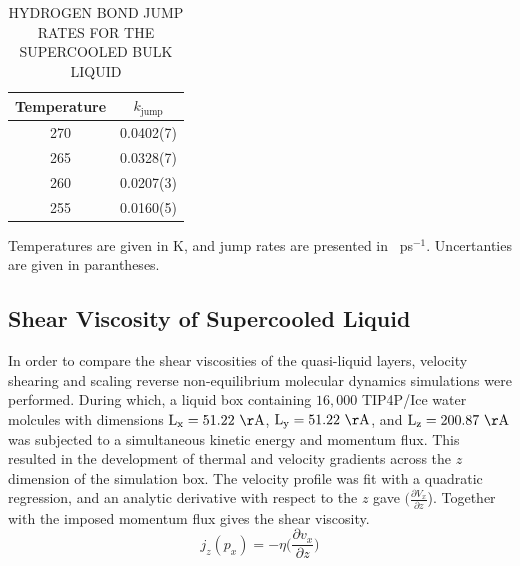 \begin{table}[h] \centering \caption{HYDROGEN BOND JUMP RATES FOR THE
    SUPERCOOLED BULK LIQUID\label{tab:bulkJump}}
\begin{tabular}{cc}
\hline
\hline
 Temperature & $k_\mathrm{jump}$ \\
\hline
270 & 0.0402(7) \\
265 & 0.0328(7) \\
260 & 0.0207(3)  \\
255 & 0.0160(5) \\
\hline
\hline
\end{tabular}
\begin{flushleft}
  Temperatures are given in K, and jump rates are presented in
  ~ps$^{-1}$. Uncertanties are given in parantheses.
\end{flushleft}
\end{table}

           

\subsection{Shear Viscosity of Supercooled Liquid}
In order to compare the shear viscosities of the quasi-liquid layers,
velocity shearing and scaling reverse non-equilibrium molecular
dynamics simulations were performed. During which, a liquid box
containing $16,000$ TIP4P/Ice water molcules with dimensions
$\mathrm{L_x} = 51.22~\mathrm{\AA}$,
$\mathrm{L_y} = 51.22~\mathrm{\AA}$, and
$\mathrm{L_z}=200.87~\mathrm{\AA}$ was subjected to a simultaneous
kinetic energy and momentum flux. This resulted in the development of
thermal and velocity gradients across the $z$ dimension of the
simulation box. The velocity profile was fit with a quadratic
regression, and an analytic derivative with respect to the $z$ gave
$(\frac{\partial V_x}{\partial z}$). Together with the imposed
momentum flux gives the shear viscosity.
\begin{equation}\label{eq:viscosity}
  j_{z}(p_{x}) = -\eta \big(\frac{\partial v_{x}}{\partial z}\big)
\end{equation}

